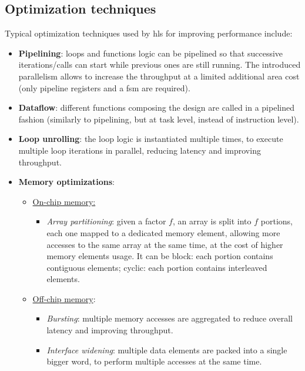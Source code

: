 \documentclass[11pt,a4paper,oneside]{memoir}
\begin{document}
\subsection{Optimization techniques}
Typical optimization techniques used by \ac{hls} for improving performance
include:
\begin{itemize}
	\item \textbf{Pipelining}: loops and functions logic can be pipelined
		so that successive iterations/calls can start while previous
		ones are still running. The introduced parallelism allows to
		increase the throughput at a limited additional area cost (only
		pipeline registers and a \acs{fsm} are required).
	\item \textbf{Dataflow}: different functions composing the design are
		called in a pipelined fashion (similarly to pipelining, but at
		task level, instead of instruction level).
	\item \textbf{Loop unrolling}: the loop logic is instantiated multiple
		times, to execute multiple loop iterations in parallel,
		reducing latency and improving throughput.
	\item \textbf{Memory optimizations}:
		\begin{itemize}
			\item \underline{On-chip memory:}
				\begin{itemize}
					\item \emph{Array partitioning}:
						given a factor $f$, an array is
						split into $f$ portions, each
						one mapped to a dedicated
						memory element, allowing more
						accesses to the same array at
						the same time, at the cost of
						higher memory elements usage.
						It can be block: each portion
						contains contiguous elements;
						cyclic: each portion contains
						interleaved elements.
				\end{itemize}
			\item \underline{Off-chip memory}:
				\begin{itemize}
					\item \emph{Bursting}: multiple memory
						accesses are aggregated to
						reduce overall latency and
						improving throughput.
					\item \emph{Interface widening}:
						multiple data elements are
						packed into a single bigger
						word, to perform multiple
						accesses at the same time.
				\end{itemize}
		\end{itemize}
\end{itemize}
\end{document}
